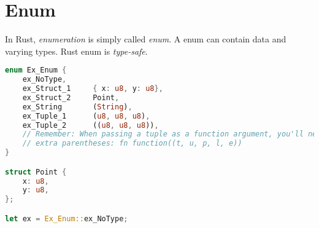 \section{Enum}
In Rust, \emph{enumeration} is simply called \emph{enum}. A enum can contain
data and varying types. Rust enum is \emph{type-safe}.
\begin{lstlisting}[language=rust, style=boxed]
enum Ex_Enum {
	ex_NoType,
	ex_Struct_1		{ x: u8, y: u8},
	ex_Struct_2		Point,
	ex_String		(String),
	ex_Tuple_1		(u8, u8, u8),
	ex_Tuple_2		((u8, u8, u8)),
	// Remember: When passing a tuple as a function argument, you'll need
	// extra parentheses: fn function((t, u, p, l, e))
}

struct Point {
	x: u8,
	y: u8,
};

let ex = Ex_Enum::ex_NoType;
\end{lstlisting}
